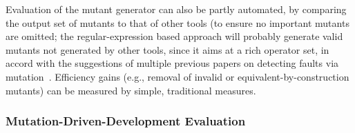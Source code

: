 Evaluation of the mutant generator can also be partly automated, by
comparing the output set of mutants to that of other tools (to ensure
no important mutants are omitted; the regular-expression based
approach will probably generate valid mutants not generated by other
tools, since it aims at a rich operator set, in accord with the
suggestions of multiple previous papers on detecting faults via
mutation~\cite{just2014mutants,gopinath2017mutation}.  Efficiency
gains (e.g., removal of invalid or equivalent-by-construction mutants) can
be measured by simple, traditional measures.

\subsubsection{Mutation-Driven-Development Evaluation}
\label{sec:mevalplan}